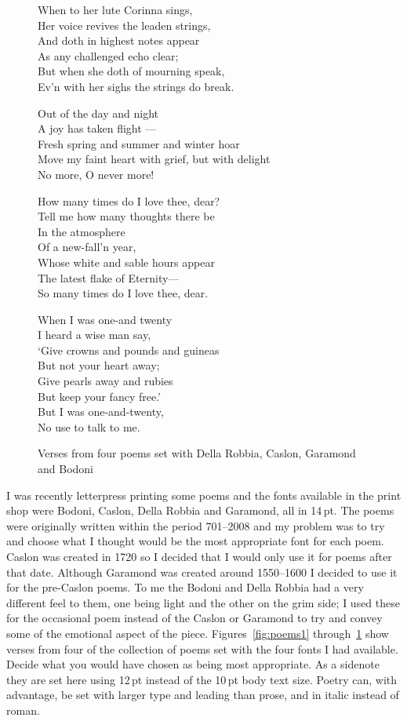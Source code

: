 \documentclass[10pt,letterpaper,extrafontsizes]{memoir}
\newcommand*{\thisfont}[5]{\fontencoding{T1}%
  \fontsize{#1}{#2}\fontfamily{#3}\fontseries{#4}\fontshape{#5}%
  \selectfont}
\newcommand*{\pickfont}[1]{\thisfont{12}{14}{#1}{m}{n}}
\newcommand*{\caslon}{\pickfont{5ca}}
\newcommand*{\garamond}{\pickfont{5gm}}
\newcommand*{\della}{\pickfont{5de}}
\newcommand*{\bodoni}{\pickfont{5bd}}
\renewcommand*{\pickfont}[1]{\thisfont{12}{14}{ppl}{m}{n}}
\newcommand*{\Shelley}{%
\hspace*{2em} Out of the day and night \\
\hspace*{2em} A joy has taken flight --- \\
Fresh spring and summer and winter hoar \\
\hspace*{1em} Move my faint heart with grief, but with delight \\
\hspace*{2em} No more, O never more!}
\newcommand*{\Beddoes}{%
How many times do I love thee, dear? \\
\hspace*{1em} Tell me how many thoughts there be \\
\hspace*{4em} In the atmosphere \\
\hspace*{4em} Of a new-fall'n year, \\
Whose white and sable hours appear \\
\hspace*{1em} The latest flake of Eternity--- \\
So many times do I love thee, dear.}
\newcommand*{\Campion}{%
When to her lute Corinna sings, \\
Her voice revives the leaden strings, \\
And doth in highest notes appear \\
As any challenged echo clear; \\
But when she doth of mourning speak, \\
Ev'n with her sighs the strings do break.}
\newcommand*{\Housman}{%
When I was one-and twenty \\
\hspace*{1em} I heard a wise man say, \\
`Give crowns and pounds and guineas \\
\hspace*{1em} But not your heart away; \\
Give pearls away and rubies \\
\hspace*{1em} But keep your fancy free.' \\
But I was one-and-twenty, \\
\hspace*{1em} No use to talk to me.}
\newcommand\U[2]{\textrm{#1}\,\textrm{#2}}
\begin{document}
\begin{figure}
\begin{adjustwidth}{-0.05\textwidth}{-0.05\textwidth}
\centering
\begin{minipage}[t]{0.52\textwidth}\della
\Campion
\end{minipage}
\hfill
\begin{minipage}[t]{0.52\textwidth}\caslon
\Shelley
\end{minipage}

\vspace*{2\onelineskip}

\begin{minipage}[t]{0.52\textwidth}\garamond
\Beddoes
\end{minipage}
\hfill
\begin{minipage}[t]{0.52\textwidth}\bodoni
\Housman
\end{minipage}
\caption{Verses from four poems set with Della Robbia, Caslon, Garamond and Bodoni}\label{fig:poems4}
\end{adjustwidth}
\end{figure}


    I was recently letterpress printing some poems and the fonts  
available in the print shop were Bodoni, 
Caslon, Della Robbia and 
Garamond, 
all in \U{14}{pt}. The poems
were originally written within the period 701--2008 and my problem was to
try and choose what I thought would be the most appropriate font for each
poem. Caslon was created in 1720 so I decided that 
I would only use it for poems after that date. Although 
Garamond was created around 1550--1600 I
decided to use it for the pre-Caslon poems. 
To me the Bodoni and 
Della Robbia  
had a very different feel to them, one being light and the other on the grim
side; I used these for the occasional poem instead of the 
Caslon or Garamond
to try and convey some of the emotional aspect of the piece. 
Figures~\ref{fig:poems1} through~\ref{fig:poems4} show verses from four
of the collection of poems set with the four fonts I had available. 
Decide what you would have chosen as being most appropriate. As a 
sidenote they are set here using \U{12}{pt} instead of the \U{10}{pt} body text size.
Poetry can, with advantage, be set with larger type and 
leading than prose,
and in italic instead of roman.
\end{document}
